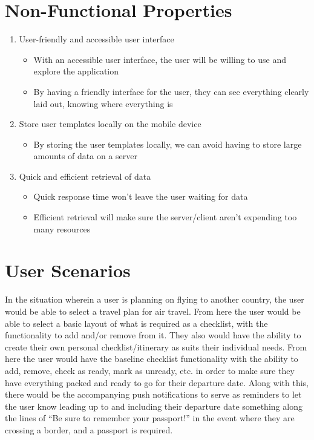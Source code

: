 \documentclass[12pt]{article}
\begin{document}
	\section*{Non-Functional Properties}


	\begin{enumerate}

		\item{User-friendly and accessible user interface}
		\begin{itemize}
			\item{With an accessible user interface, the user will be willing to use and explore the application}
			\item{By having a friendly interface for the user, they can see everything clearly laid out, knowing where everything is}
		\end{itemize}

		\item{Store user templates locally on the mobile device}
		\begin{itemize}
			\item{By storing the user templates locally, we can avoid having to store large amounts of data on a server}
		\end{itemize}

		\item{Quick and efficient retrieval of data}
		\begin{itemize}
			\item{Quick response time won't leave the user waiting for data}
			\item{Efficient retrieval will make sure the server/client aren't expending too many resources}
		\end{itemize}
	\end{enumerate}

	\pagebreak

	\section*{User Scenarios}

	In the situation wherein a user is planning on flying to another country,
	the user would be able to select a travel plan for air travel.
	From here the user would be able to select a basic layout of what is required as a checklist,
	with the functionality to add and/or remove from it.
	They also would have the ability to create their own personal checklist/itinerary as suits their individual needs.
	From here the user would have the baseline checklist functionality with the ability to
	add, remove, check as ready, mark as unready, etc.
	in order to make sure they have everything packed and ready to go for their departure date.
	Along with this, there would be the accompanying push notifications to serve as reminders to
	let the user know leading up to and including their departure date something along the lines of
	``Be sure to remember your passport!'' in the event where they are crossing a border, and a passport is required.
\end{document}
